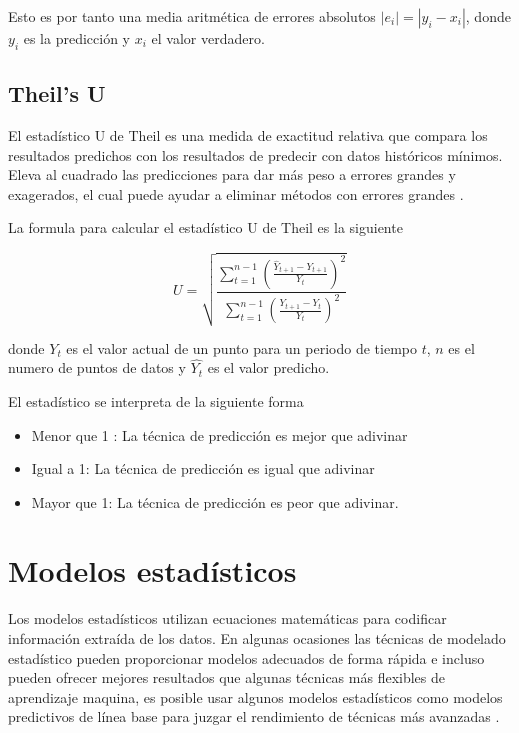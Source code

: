 Esto es por tanto una media aritmética de errores absolutos $\left|e_{i}\right| = \left|y_{i}-x_{i}\right|$, donde $y_i$ es la predicción y $x_i$ el valor verdadero.

\subsection{Theil's U}

El estadístico U de Theil es una medida de exactitud relativa que compara los resultados predichos con los resultados de predecir con datos históricos mínimos. Eleva al cuadrado las predicciones para dar más peso a errores grandes y exagerados, el cual puede ayudar a eliminar métodos con errores grandes \cite{OracleCrystalBall}.

La formula para calcular el estadístico U de Theil es la siguiente

\[
U=\sqrt{\frac{\sum_{t=1}^{n-1}\left(\frac{\hat{Y}_{t+1}-Y_{t+1}}{Y_{t}}\right)^{2}}{\sum_{t=1}^{n-1}\left(\frac{Y_{t+1}-Y_{t}}{Y_{t}}\right)^{2}}}
\]

donde $Y_t$ es el valor actual de un punto para un periodo de tiempo $t$, $n$ es el numero de puntos de datos y $\hat{Y_t}$ es el valor predicho.

El estadístico se interpreta de la siguiente forma

\begin{itemize}
	\item Menor que 1 : La técnica de predicción es mejor que adivinar
	\item  Igual a 1: La técnica de predicción es igual que adivinar
	\item Mayor que 1: La técnica de predicción es peor que adivinar.
\end{itemize}

\section{Modelos estadísticos}

Los modelos estadísticos utilizan ecuaciones matemáticas para codificar información extraída de los datos. En algunas ocasiones las técnicas de modelado estadístico pueden proporcionar modelos adecuados de forma rápida e incluso pueden ofrecer mejores resultados que algunas técnicas más flexibles de aprendizaje maquina, es posible usar algunos modelos estadísticos como modelos predictivos de línea base para juzgar el rendimiento de técnicas más avanzadas \cite{IBMDocs2021}. 

